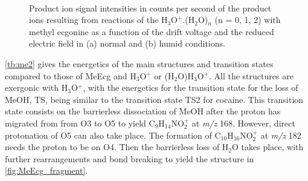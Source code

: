 \begin{figure}[htbp]
\centering
{}\\
\caption{Product ion signal intensities in counts per second of the product ions resulting from reactions of the H$_3$O$^+$.(H$_2$O)$_n$ (n = 0, 1, 2) with methyl ecgonine as a function of the drift voltage and the reduced electric field in (a) normal and (b) humid conditions.}
\label{fig:MeEcgEN}
\end{figure}



\autoref{tb:me2} gives the energetics of the main structures and transition states compared to those of MeEcg and H$_3$O$^+$ or (H$_2$O)H$_3$O$^+$.
%
All the structures are exergonic with H$_3$O$^+$, with the energetics for the transition state for the loss of MeOH, TS, being  similar to the transition state TS2 for cocaine.
%
This transition state consists on the barrierless dissociation of MeOH after the proton has migrated from from O3 to O5 to yield C$_9$H$_{14}$NO$_2^+$ at \textit{m/z} 168. However, direct protonation of O5 can also take place. 
%
The formation of C$_{10}$H$_{16}$NO$_2^+$ at \textit{m/z} 182  needs the proton to be on O4.
%
Then the barrierless loss of H$_2$O takes place, with further rearrangements and bond breaking to yield the structure in \autoref{fig:MeEcg_fragment}.

